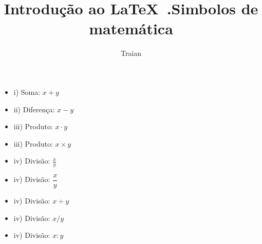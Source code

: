 \documentclass [a4paper, 14pt] {article}
\title {Introdução ao \LaTeX\ .}
\author {Traian}
\begin{document}
\maketitle

\title {Simbolos de matemática}

\begin {itemize} %

\item [i)] Soma: $x+y$
\item [ii)] Diferença: $x-y$
\item [iii)] Produto: $x\cdot y$
\item [iii)] Produto: $x\times y$
\item [iv)] Divisão: $\frac{x}{y}$
\item [iv)] Divisão: $\dfrac{x}{y}$
\item [iv)] Divisão: $x\div y$
\item [iv)] Divisão: $x / y$
\item [iv)] Divisão: $x : y$

\end {itemize}
\end{document}
